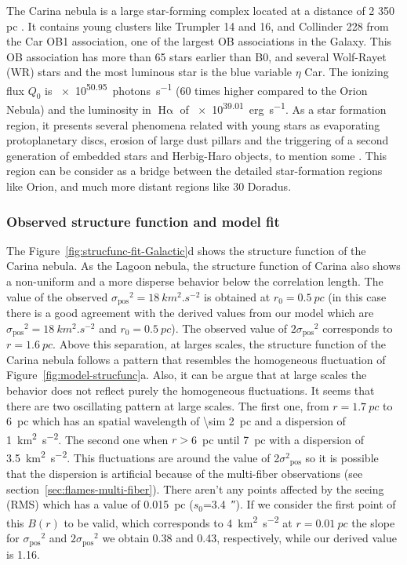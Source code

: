 \documentclass[fleqn,usenatbib, useAMS, a4paper]{mnras}
\newcommand\pos{\ensuremath{_{\mathrm{pos}}}}
\newcommand\ha{\ensuremath{\text{H}\upalpha}}
\begin{document}
The Carina nebula is a large star-forming complex located at a distance of 2 350 pc \citetext{\SI{1}{\arcsecond} = \SI{0.01}{pc} ; \citealp{2006ApJ...644.1151S}}.
It contains young clusters like Trumpler 14 and 16, and Collinder 228 from the Car OB1 association, one of the largest OB associations in the Galaxy.
This OB association has more than 65 stars earlier than B0, and several Wolf-Rayet (WR) stars and the most luminous star is the blue variable $\eta$ Car.
The ionizing flux \(Q_0\) is \SI{e50.95}{photons.s^{-1}} \citep{2008hsf2.book..138S} (60 times higher compared to the Orion Nebula) and the luminosity in \ha{} of \SI{e39.01}{erg.s^{-1}}.
As a star formation region, it presents several phenomena related with young stars as evaporating protoplanetary discs, erosion of large dust pillars and the triggering of a second generation of embedded stars and Herbig-Haro objects, to mention some \citetext{see \citealp{2008hsf2.book..138S} and reference therein}. 
This region can be consider as a bridge between the detailed star-formation regions like Orion, and much more distant regions like 30 Doradus.

\subsubsection{Observed structure function and model fit}
\label{sec:observ-struct-funct-carina}

The Figure~\ref{fig:strucfunc-fit-Galactic}d shows the structure function of the Carina nebula.
As the Lagoon nebula, the structure function of Carina also shows a non-uniform and a more disperse behavior below the correlation length.
The value of the observed \(\sigma\pos^2 = \SI{18}{km^{2}.s^{-2}}\) is obtained at \(r_0 = \SI{0.5}{pc} \) (in this case there is a good agreement with the derived values from our model which are \(\sigma\pos^2 = \SI{18}{km^{2}.s^{-2}}\) and \(r_0 = \SI{0.5}{pc} \)).
The observed value of \(2\sigma\pos^2\) corresponds to \(r = \SI{1.6}{pc} \).
Above this separation, at larges scales, the structure function of the Carina nebula follows a pattern that resembles the homogeneous fluctuation of Figure~\ref{fig:model-strucfunc}a.
Also, it can be argue that at large scales the behavior does not reflect purely the homogeneous fluctuations. 
It seems that there are two  oscillating pattern at large scales.
The first one, from \(r = \SI{1.7}{pc} \) to \SI{6}{pc} which has an spatial wavelength of \SI{\sim 2}{pc} and a dispersion of \SI{1}{km^{2}.s^{-2}}.
The second one when \(r >\)\SI{6}{pc} until \SI{7}{pc} with a dispersion of \SI{3.5}{km^{2}.s^{-2}}.
This fluctuations are around the value of 2\(\sigma^2\pos\) so it is possible that the dispersion is artificial because of the multi-fiber observations (see section~\ref{sec:flames-multi-fiber}).
There aren't any points affected by the seeing (RMS) which has a value of \SI{0.015}{pc} (\(s_0\)=\SI{3.4}{\arcsecond}).
If we consider the first point of this \(B(r)\) to be valid, which corresponds to \SI{4}{km^{2}.s^{-2}} at \(r = \SI{0.01}{pc} \) the slope for \(\sigma\pos^2\) and \(2\sigma\pos^2\) we obtain \num{0.38} and \num{0.43}, respectively, while our derived value is \num{1.16}.
\end{document}
